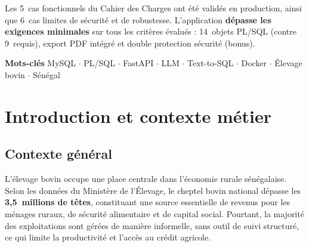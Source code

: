 \documentclass[12pt, a4paper, oneside]{report}
\begin{document}
\vspace{0.8em}

\noindent Les 5~cas fonctionnels du Cahier des Charges ont été validés en production,
ainsi que 6~cas limites de sécurité et de robustesse. L'application \textbf{dépasse les
exigences minimales} sur tous les critères évalués : 14~objets PL/SQL (contre 9~requis),
export PDF intégré et double protection sécurité (bonus).

\vspace{1.4em}

\begin{center}
  \colorbox{bovibrown!10}{%
    \begin{minipage}{0.9\textwidth}
      \vspace{0.4em}
      \centering
      {\small\bfseries\color{bovibrown}Mots-clés\quad}
      {\small\color{bovitextsoft}%
        MySQL $\cdot$ PL/SQL $\cdot$ FastAPI $\cdot$ LLM $\cdot$ Text-to-SQL $\cdot$
        Docker $\cdot$ Élevage bovin $\cdot$ Sénégal}
      \vspace{0.4em}
    \end{minipage}%
  }
\end{center}

\newpage

\setcounter{page}{1}

\chapter{Introduction et contexte métier}

\section{Contexte général}

L'élevage bovin occupe une place centrale dans l'économie rurale sénégalaise. Selon les
données du Ministère de l'Élevage, le cheptel bovin national dépasse les \textbf{3,5~millions
de têtes}, constituant une source essentielle de revenus pour les ménages ruraux, de sécurité
alimentaire et de capital social. Pourtant, la majorité des exploitations sont gérées de
manière informelle, sans outil de suivi structuré, ce qui limite la productivité et
l'accès au crédit agricole.
\end{document}
